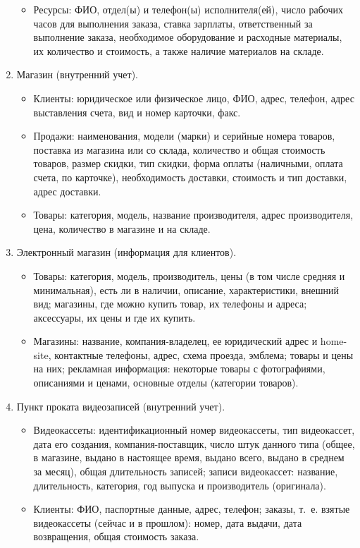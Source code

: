 \documentclass[12pt, openany, twoside]{book} %
\begin{document}
\begin{enumerate}
\begin{itemize}
\item Ресурсы: ФИО, отдел(ы) и телефон(ы) исполнителя(ей), число рабочих часов для выполнения заказа, ставка зарплаты, ответственный за выполнение заказа, необходимое оборудование и расходные материалы, их количество и стоимость, а также наличие материалов на складе.
\end{itemize}
\item Магазин (внутренний учет).
\begin{itemize}
\item Клиенты: юридическое или физическое лицо, ФИО, адрес, телефон, адрес выставления счета, вид и номер карточки, факс.
\item Продажи: наименования, модели (марки) и серийные номера товаров, поставка из магазина или со склада, количество и общая стоимость товаров, размер скидки, тип скидки, форма оплаты (наличными, оплата счета, по карточке), необходимость доставки, стоимость и тип доставки, адрес доставки.
\item Товары: категория, модель, название производителя, адрес производителя, цена, количество в магазине и на складе.
\end{itemize}
\item Электронный магазин (информация для клиентов).
\begin{itemize}
\item Товары: категория, модель, производитель, цены (в том числе средняя и минимальная), есть ли в наличии, описание, характеристики, внешний вид; магазины, где можно купить товар, их телефоны и адреса; аксессуары, их цены и где их купить.
\item Магазины: название, компания-владелец, ее юридический адрес и home-site, контактные телефоны, адрес, схема проезда, эмблема; товары и цены на них; рекламная информация: некоторые товары с фотографиями, описаниями и ценами, основные отделы (категории товаров).
\end{itemize}
\item Пункт проката видеозаписей (внутренний учет).
\begin{itemize}
\item Видеокассеты: идентификационный номер видеокассеты, тип видеокассет, дата его создания, компания-поставщик, число штук данного типа (общее, в магазине, выдано в настоящее время, выдано всего, выдано в среднем за месяц), общая длительность записей; записи видеокассет: название, длительность, категория, год выпуска и производитель (оригинала).
\item Клиенты: ФИО, паспортные данные, адрес, телефон; заказы, т.~е. взятые видеокассеты (сейчас и в прошлом): номер, дата выдачи, дата возвращения, общая стоимость заказа.

\end{itemize}
\end{enumerate}
\end{document}
